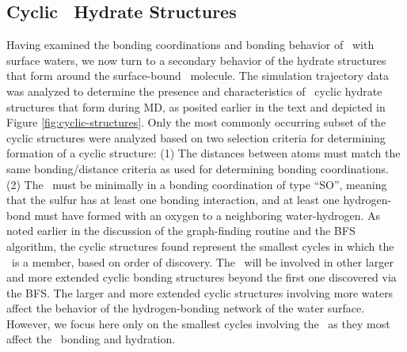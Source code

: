 \subsection{Cyclic \suldiox~Hydrate Structures}

Having examined the bonding coordinations and bonding behavior of \suldiox~with surface waters, we now turn to a secondary behavior of the hydrate structures that form around the surface-bound \suldiox~molecule. The simulation trajectory data was analyzed to determine the presence and characteristics of \suldiox~cyclic hydrate structures that form during MD, as posited earlier in the text and depicted in Figure \ref{fig:cyclic-structures}. Only the most commonly occurring subset of the cyclic structures were analyzed based on two selection criteria for determining formation of a cyclic structure: (1) The distances between atoms must match the same bonding/distance criteria as used for determining bonding coordinations. (2) The \suldiox~must be minimally in a bonding coordination of type ``SO'', meaning that the sulfur has at least one bonding interaction, and at least one hydrogen-bond must have formed with an oxygen to a neighboring water-hydrogen. As noted earlier in the discussion of the graph-finding routine and the BFS algorithm, the cyclic structures found represent the smallest cycles in which the \suldiox~is a member, based on order of discovery. The \suldiox~will be involved in other larger and more extended cyclic bonding structures beyond the first one discovered via the BFS. The larger and more extended cyclic structures involving more waters affect the behavior of the hydrogen-bonding network of the water surface. However, we focus here only on the smallest cycles involving the \suldiox~as they most affect the \suldiox~bonding and hydration.


